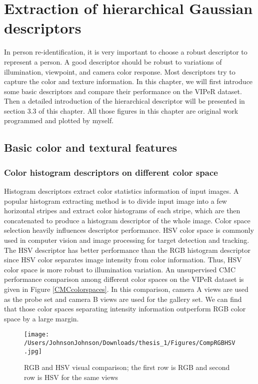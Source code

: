 \chapter{Extraction of hierarchical Gaussian descriptors}
In person re-identification, it is very important to choose a robust descriptor to represent a person. A good descriptor should be robust to variations of illumination, viewpoint, and camera color response. Most descriptors try to capture the color and texture information. In this chapter, we will first introduce some basic descriptors and compare their performance on the VIPeR dataset. Then a detailed introduction of the hierarchical descriptor will be presented in section 3.3 of this chapter. All those figures in this chapter are original work programmed and plotted by myself. 


\section{Basic color and textural features}
\subsection{Color histogram descriptors on different color space}
Histogram descriptors extract color statistics information of input images. A popular histogram extracting method is to divide input image into a few horizontal stripes and extract color histograms of each stripe, which are then concatenated to produce a histogram descriptor of the whole image. Color space selection heavily influences descriptor performance. HSV color space is commonly used in computer vision and image processing for target detection and tracking. The HSV descriptor has better performance than the RGB histogram descriptor since HSV color separates image intensity from color information. Thus, HSV color space is more robust to illumination variation. An unsupervised CMC performance comparison among different color spaces on the VIPeR dataset is given in Figure \ref{CMCcolorspaces}. In this comparison, camera A views are used as the probe set and camera B views are used for the gallery set. We can find that those color spaces separating intensity information outperform RGB color space by a large margin.

\begin{figure}[H]
\centering
\texttt{[image: /Users/JohnsonJohnson/Downloads/thesis\_1/Figures/CompRGBHSV.jpg]}
\caption{RGB and HSV visual comparison; the first row is RGB and second row is HSV for the same views }
\vspace{0em}
\end{figure} 

